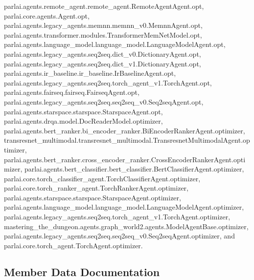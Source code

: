 parlai.\+agents.\+remote\+\_\+agent.\+remote\+\_\+agent.\+Remote\+Agent\+Agent.\+opt, parlai.\+core.\+agents.\+Agent.\+opt, parlai.\+agents.\+legacy\+\_\+agents.\+memnn.\+memnn\+\_\+v0.\+Memnn\+Agent.\+opt, parlai.\+agents.\+transformer.\+modules.\+Transformer\+Mem\+Net\+Model.\+opt, parlai.\+agents.\+language\+\_\+model.\+language\+\_\+model.\+Language\+Model\+Agent.\+opt, parlai.\+agents.\+legacy\+\_\+agents.\+seq2seq.\+dict\+\_\+v0.\+Dictionary\+Agent.\+opt, parlai.\+agents.\+legacy\+\_\+agents.\+seq2seq.\+dict\+\_\+v1.\+Dictionary\+Agent.\+opt, parlai.\+agents.\+ir\+\_\+baseline.\+ir\+\_\+baseline.\+Ir\+Baseline\+Agent.\+opt, parlai.\+agents.\+legacy\+\_\+agents.\+seq2seq.\+torch\+\_\+agent\+\_\+v1.\+Torch\+Agent.\+opt, parlai.\+agents.\+fairseq.\+fairseq.\+Fairseq\+Agent.\+opt, parlai.\+agents.\+legacy\+\_\+agents.\+seq2seq.\+seq2seq\+\_\+v0.\+Seq2seq\+Agent.\+opt, parlai.\+agents.\+starspace.\+starspace.\+Starspace\+Agent.\+opt, parlai.\+agents.\+drqa.\+model.\+Doc\+Reader\+Model.\+optimizer, parlai.\+agents.\+bert\+\_\+ranker.\+bi\+\_\+encoder\+\_\+ranker.\+Bi\+Encoder\+Ranker\+Agent.\+optimizer, transresnet\+\_\+multimodal.\+transresnet\+\_\+multimodal.\+Transresnet\+Multimodal\+Agent.\+optimizer, parlai.\+agents.\+bert\+\_\+ranker.\+cross\+\_\+encoder\+\_\+ranker.\+Cross\+Encoder\+Ranker\+Agent.\+optimizer, parlai.\+agents.\+bert\+\_\+classifier.\+bert\+\_\+classifier.\+Bert\+Classifier\+Agent.\+optimizer, parlai.\+core.\+torch\+\_\+classifier\+\_\+agent.\+Torch\+Classifier\+Agent.\+optimizer, parlai.\+core.\+torch\+\_\+ranker\+\_\+agent.\+Torch\+Ranker\+Agent.\+optimizer, parlai.\+agents.\+starspace.\+starspace.\+Starspace\+Agent.\+optimizer, parlai.\+agents.\+language\+\_\+model.\+language\+\_\+model.\+Language\+Model\+Agent.\+optimizer, parlai.\+agents.\+legacy\+\_\+agents.\+seq2seq.\+torch\+\_\+agent\+\_\+v1.\+Torch\+Agent.\+optimizer, mastering\+\_\+the\+\_\+dungeon.\+agents.\+graph\+\_\+world2.\+agents.\+Model\+Agent\+Base.\+optimizer, parlai.\+agents.\+legacy\+\_\+agents.\+seq2seq.\+seq2seq\+\_\+v0.\+Seq2seq\+Agent.\+optimizer, and parlai.\+core.\+torch\+\_\+agent.\+Torch\+Agent.\+optimizer.



\subsection{Member Data Documentation}
\mbox{\label{classmastering__the__dungeon_1_1agents_1_1graph__world2_1_1agents_1_1ModelAgentBase_a3c6da213b730abbba55d22aed93ab5ad}} 
